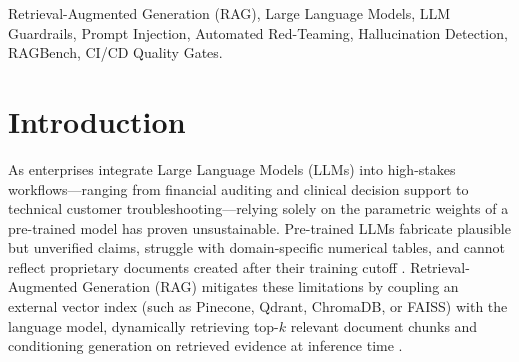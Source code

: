 \documentclass[conference]{IEEEtran}
\begin{document}
\begin{IEEEkeywords}
Retrieval-Augmented Generation (RAG), Large Language Models, LLM Guardrails, Prompt Injection, Automated Red-Teaming, Hallucination Detection, RAGBench, CI/CD Quality Gates.
\end{IEEEkeywords}

\section{Introduction}
As enterprises integrate Large Language Models (LLMs) into high-stakes workflows—ranging from financial auditing and clinical decision support to technical customer troubleshooting—relying solely on the parametric weights of a pre-trained model has proven unsustainable. Pre-trained LLMs fabricate plausible but unverified claims, struggle with domain-specific numerical tables, and cannot reflect proprietary documents created after their training cutoff \cite{lewis2020rag, ji2023survey}. Retrieval-Augmented Generation (RAG) mitigates these limitations by coupling an external vector index (such as Pinecone, Qdrant, ChromaDB, or FAISS) with the language model, dynamically retrieving top-$k$ relevant document chunks and conditioning generation on retrieved evidence at inference time \cite{gao2023ragsurvey}.
\end{document}
